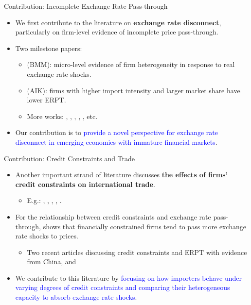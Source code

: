 \documentclass[10pt]{beamer}
\begin{document}
\begin{frame}{Contribution: Incomplete Exchange Rate Pass-through}
	\begin{itemize}
		\item We first contribute to the literature on \textbf{exchange rate disconnect}, particularly on firm-level evidence of incomplete price pass-through.
		\item Two milestone papers:
		\begin{itemize}
			\item \cite{bmm2012} (BMM): micro-level evidence of firm heterogeneity in response to real exchange rate shocks.
			\item \cite{aik2014} (AIK): firms with higher import intensity and larger market share have lower ERPT.
			\item More works: \cite{lmx2015}, \cite{chen2016}, \cite{garetto2016}, \cite{auer2016}, \cite{devereux2017}, etc.
		\end{itemize}
		\item Our contribution is to \textcolor{blue}{provide a novel perspective for exchange rate disconnect in emerging economies with immature financial markets}.
	\end{itemize}
\end{frame}

\begin{frame}{Contribution: Credit Constraints and Trade}
	\begin{itemize}
		\item Another important strand of literature discusses \textbf{the effects of firms’ credit constraints on international trade}.
            \begin{itemize}
                \item E.g.: \cite{kroszner2007} \cite{manova2013}, \cite{chaney2016}, \cite{feenstra2015}, \cite{manova-wei-zhang2015}, \cite{fan-lai-li2015}.
            \end{itemize}
		\item For the relationship between credit constraints and exchange rate pass-through, \cite{strasser2013} shows that financially constrained firms tend to pass more exchange rate shocks to prices.
		\begin{itemize}
			\item Two recent articles discussing credit constraints and ERPT with evidence from China, \cite{dai2021} and \cite{xu-guo2021}
		\end{itemize}
		\item We contribute to this literature by \textcolor{blue}{focusing on how importers behave under varying degrees of credit constraints and comparing their heterogeneous capacity to absorb exchange rate shocks}. 
	\end{itemize}	
\end{frame}
\end{document}
